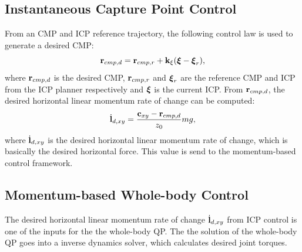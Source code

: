 \subsection{Instantaneous Capture Point Control}
From an \ac{CMP} and \ac{ICP} reference trajectory, the following control law is used to generate a desired \ac{CMP}:
\begin{equation}
    \mathbf{r}_{cmp,d}=\mathbf{r}_{cmp,r} + \mathbf{k}_{\xi}(\boldsymbol{\xi}-\boldsymbol{\xi}_r),
    \label{eq:rcmpd}
\end{equation}
where $\mathbf{r}_{cmp,d}$ is the desired \ac{CMP}, $\mathbf{r}_{cmp,r}$ and $\boldsymbol{\xi}_r$ are the reference \ac{CMP} and \ac{ICP} from the \ac{ICP} planner respectively and $\boldsymbol{\xi}$ is the current \ac{ICP}. From $\mathbf{r}_{cmp,d}$, the desired horizontal linear momentum rate of change can be computed:
\begin{equation}\label{eq:dotldxy}
    \dot{\mathbf{l}}_{d,xy} = \frac{\mathbf{c}_{xy}-\mathbf{r}_{cmp,d}}{z_0}mg,
\end{equation}
where $\dot{\mathbf{l}}_{d,xy}$ is the desired horizontal linear momentum rate of change, which is basically the desired horizontal force. This value is send to the momentum-based control framework. 

\subsection{Momentum-based Whole-body Control}
The desired horizontal linear momentum rate of change $\dot{\mathbf{l}}_{d,xy}$ from \ac{ICP} control is one of the inputs for the the whole-body \ac{QP}. The the solution of the whole-body \ac{QP} goes into a inverse dynamics solver, which calculates desired joint torques. 
